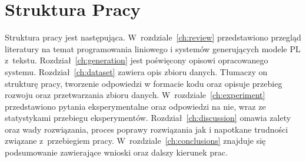 \section{Struktura Pracy}

Struktura pracy jest następująca. W~rozdziale~\ref{ch:review} przedstawiono przegląd literatury na temat programowania liniowego i systemów generujących modele PL z~tekstu. Rozdział~\ref{ch:generation} jest poświęcony opisowi opracowanego systemu. Rozdział~\ref{ch:dataset} zawiera opis zbioru danych. Tłumaczy on strukturę pracy, tworzenie odpowiedzi w formacie kodu  oraz opisuje przebieg rozwoju oraz przetwarzania zbioru danych. W~rozdziale~\ref{ch:experiment} przedstawiono pytania eksperymentalne oraz odpowiedzi na nie, wraz ze statystykami przebiegu eksperymentów. Rozdział~\ref{ch:discussion} omawia zalety oraz wady rozwiązania, proces poprawy rozwiązania jak i napotkane trudności związane z~przebiegiem pracy. W~rozdziale~\ref{ch:conclusions} znajduje się podsumowanie zawierające wnioski oraz dalszy kierunek prac.
